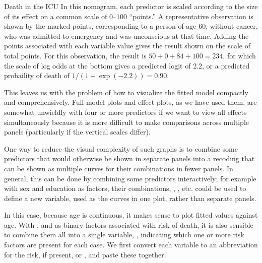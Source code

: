\documentclass[11pt]{book}
\begin{document}
\begin{Example}[icu1]{Death in the ICU}
In this nomogram, each predictor is scaled according to the size of its effect on a common scale
of 0--100 ``points.''  A representative observation is shown by the marked points, 
corresponding to a person of age 60, without cancer, who was admitted to emergency
and was unconscious at that time.  Adding the points associated with each variable
value gives the result shown on the scale of total points.
For this observation, the result is $50 + 0 + 84 +100 = 234$, for which the
scale of log odds at the bottom gives a predicted logit of 2.2, or a predicted 
probaility of death of $1/(1+\exp({-2.2}))= 0.90$.

This leaves us with the problem of how to visualize the fitted model compactly
and comprehensively.   Full-model plots and effect plots, as we have used them,
are somewhat unwieldly with four or more predictors if we want to view all
effects simultaneously because it is more difficult to make comparisons
across multiple panels (particularly if the vertical scales differ).

One way to reduce the visual complexity of such graphs is to combine some predictors
that would otherwise be shown in separate panels into a recoding that can be
shown as multiple curves for their combinations in fewer panels.  In general,
this can be done by combining some predictors interactively; for example
with sex and education as factors, their combinations, , ,
etc. could be used to define a new variable,  used as the curves
in one plot, rather than separate panels.

In this case, because age is continuous, it makes sense to plot fitted values
against age.  With ,   and   as binary
factors associated with risk of death, it is also sensible to combine them
all into a single variable, , indicating which one or more
risk factors are present for each case.  We first convert each variable
to an abbreviation for the risk, if present, or , and paste
these together.


\end{Example}
\end{document}
